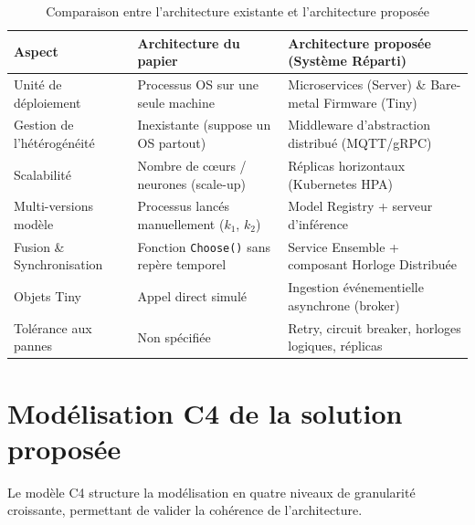 \documentclass[11pt,a4paper]{article}
\begin{document}
\begin{table}[ht]
\centering
\small
\begin{tabularx}{\textwidth}{@{}l X X@{}}
\toprule
\textbf{Aspect} & \textbf{Architecture du papier} & \textbf{Architecture proposée (Système Réparti)} \\
\midrule
Unité de déploiement & Processus OS sur une seule machine & Microservices (Server) \& Bare-metal Firmware (Tiny) \\
Gestion de l'hétérogénéité & Inexistante (suppose un OS partout) & Middleware d'abstraction distribué (MQTT/gRPC) \\
Scalabilité & Nombre de cœurs / neurones (scale-up) & Réplicas horizontaux (Kubernetes HPA) \\
Multi-versions modèle & Processus lancés manuellement ($k_1$, $k_2$) & Model Registry + serveur d'inférence \\
Fusion \& Synchronisation & Fonction \texttt{Choose()} sans repère temporel & Service Ensemble + composant Horloge Distribuée \\
Objets Tiny & Appel direct simulé & Ingestion événementielle asynchrone (broker) \\
Tolérance aux pannes & Non spécifiée & Retry, circuit breaker, horloges logiques, réplicas \\
\bottomrule
\end{tabularx}
\caption{Comparaison entre l'architecture existante et l'architecture proposée}
\end{table}

\section{Modélisation C4 de la solution proposée}

Le modèle C4 structure la modélisation en quatre niveaux de granularité
croissante, permettant de valider la cohérence de l'architecture.

\end{document}
